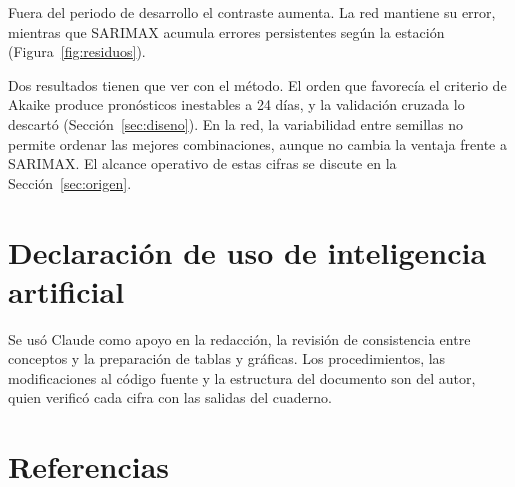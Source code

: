 \documentclass[11pt,letterpaper]{article}
\begin{document}
Fuera del periodo de desarrollo el contraste aumenta. La red mantiene su error, mientras que SARIMAX acumula errores persistentes según la estación (Figura~\ref{fig:residuos}).

Dos resultados tienen que ver con el método. El orden que favorecía el criterio de Akaike produce pronósticos inestables a 24 días, y la validación cruzada lo descartó (Sección~\ref{sec:diseno}). En la red, la variabilidad entre semillas no permite ordenar las mejores combinaciones, aunque no cambia la ventaja frente a SARIMAX. El alcance operativo de estas cifras se discute en la Sección~\ref{sec:origen}.

\section{Declaración de uso de inteligencia artificial}

Se usó Claude como apoyo en la redacción, la revisión de consistencia entre conceptos y la preparación de tablas y gráficas. Los procedimientos, las modificaciones al código fuente y la estructura del documento son del autor, quien verificó cada cifra con las salidas del cuaderno.

\section{Referencias}
\end{document}
